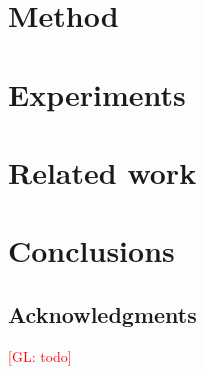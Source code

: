\documentclass{article}
\newcommand{\glnote}[1]{\textcolor{red}{[GL: #1]}}
\begin{document}
\section{Method}





\section{Experiments}


\section{Related work}


\section{Conclusions}


\subsection*{Acknowledgments}

\glnote{todo}



\end{document}
